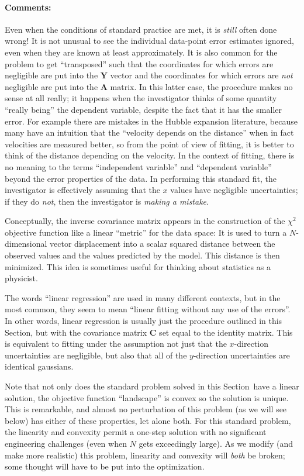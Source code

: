 \documentclass[12pt,twoside]{article}
\newcommand{\sectionname}{Section}
\newcommand{\commentsname}{Comments}
\newcounter{problem}
\newenvironment{comments}{\paragraph{\commentsname:}}{}
\newcommand{\mmatrix}[1]{\boldsymbol{#1}}
\newcommand{\mA}{\mmatrix{A}}
\newcommand{\mC}{\mmatrix{C}}
\newcommand{\mY}{\mmatrix{Y}}
\begin{document}
\begin{comments}
Even when the conditions of standard practice are met, it is
\emph{still} often done wrong!  It is not unusual to see the
individual data-point error estimates ignored, even when they are
known at least approximately.  It is also common for the problem to
get ``transposed'' such that the coordinates for which errors are
negligible are put into the $\mY$ vector and the coordinates for which
errors are \emph{not} negligible are put into the $\mA$ matrix.  In
this latter case, the procedure makes no sense at all really; it
happens when the investigator thinks of some quantity ``really being''
the dependent variable, despite the fact that it has the smaller
error.  For example there are mistakes in the Hubble expansion
literature, because many have an intuition that the ``velocity depends
on the distance'' when in fact velocities are measured better, so from
the point of view of fitting, it is better to think of the distance
depending on the velocity.  In the context of fitting, there is no
meaning to the terms ``independent variable'' and ``dependent
variable'' beyond the error properties of the data.  In performing
this standard fit, the investigator is effectively assuming that the
$x$ values have negligible uncertainties; if they do \emph{not}, then
the investigator is \emph{making a mistake}.

Conceptually, the inverse covariance matrix appears in the
construction of the $\chi^2$ objective function like a linear
``metric'' for the data space: It is used to turn a $N$-dimensional
vector displacement into a scalar squared distance between the
observed values and the values predicted by the model. This distance
is then minimized.  This idea is sometimes useful for thinking about
statistics as a physicist.

The words ``linear regression'' are used in many different contexts,
but in the most common, they seem to mean ``linear fitting without any
use of the errors''.  In other words, linear regression is usually
just the procedure outlined in this \sectionname, but with the
covariance matrix $\mC$ set equal to the identity matrix.  This is
equivalent to fitting under the assumption not just that the
$x$-direction uncertainties are negligible, but also that all of the
$y$-direction uncertainties are identical gaussians.

Note that not only does the standard problem solved in this
\sectionname\ have a linear solution, the objective function
``landscape'' is convex so the solution is unique.  This is
remarkable, and almost no perturbation of this problem (as we will see
below) has either of these properties, let alone both.  For this
standard problem, the linearity and convexity permit a one-step
solution with no significant engineering challenges (even when $N$
gets exceedingly large).  As we modify (and make more realistic) this
problem, linearity and convexity will \emph{both} be broken; some
thought will have to be put into the optimization.
\end{comments}
\end{document}
